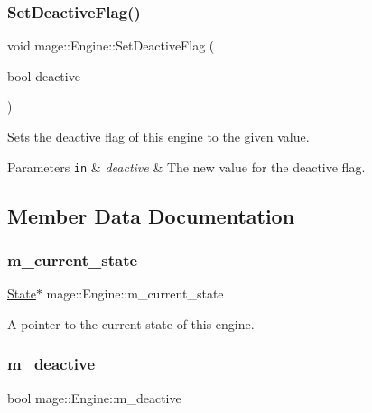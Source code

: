 \subsubsection{\texorpdfstring{Set\+Deactive\+Flag()}{SetDeactiveFlag()}}
{\footnotesize\ttfamily void mage\+::\+Engine\+::\+Set\+Deactive\+Flag (\begin{DoxyParamCaption}\item[{bool}]{deactive }\end{DoxyParamCaption})}

Sets the deactive flag of this engine to the given value.


\begin{DoxyParams}[1]{Parameters}
\mbox{\tt in}  & {\em deactive} & The new value for the deactive flag. \\
\hline
\end{DoxyParams}


\subsection{Member Data Documentation}
\hypertarget{classmage_1_1_engine_a2fd08d91f80356ee64248bc46c9b6701}{}\label{classmage_1_1_engine_a2fd08d91f80356ee64248bc46c9b6701} 
\subsubsection{\texorpdfstring{m\+\_\+current\+\_\+state}{m\_current\_state}}
{\footnotesize\ttfamily \hyperlink{classmage_1_1_state}{State}$\ast$ mage\+::\+Engine\+::m\+\_\+current\+\_\+state\hspace{0.3cm}{\ttfamily [private]}}

A pointer to the current state of this engine. \hypertarget{classmage_1_1_engine_ab8a4b0157403708ae7d1d018a95b4c63}{}\label{classmage_1_1_engine_ab8a4b0157403708ae7d1d018a95b4c63} 
\subsubsection{\texorpdfstring{m\+\_\+deactive}{m\_deactive}}
{\footnotesize\ttfamily bool mage\+::\+Engine\+::m\+\_\+deactive\hspace{0.3cm}{\ttfamily [private]}}

